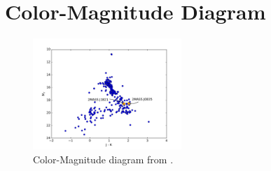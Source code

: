 \documentclass[twocolumn]{aastex6}
\begin{document}
\section{Color-Magnitude Diagram}
\begin{figure}
\begin{centering}
\includegraphics[width=0.5\textwidth]{color_mag.pdf}
\caption{Color-Magnitude diagram from \citet{dupuy2012ltparallax}.}\label{fig:CMD}
\end{centering}
\end{figure}






\end{document}

